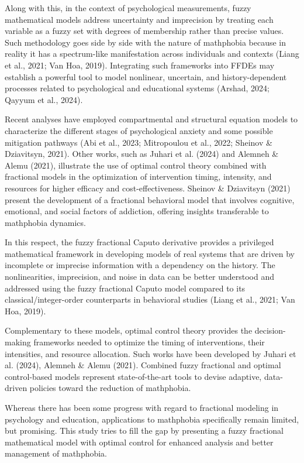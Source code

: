 \documentclass[10pt]{NSP1}
\begin{document}
Along with this, in the context of psychological measurements, fuzzy mathematical models address uncertainty and imprecision by treating each variable as a fuzzy set with degrees of membership rather than precise values. Such methodology goes side by side with the nature of mathphobia because in reality it has a spectrum-like manifestation across individuals and contexts (Liang et al., 2021; Van Hoa, 2019). Integrating such frameworks into FFDEs may establish a powerful tool to model nonlinear, uncertain, and history-dependent processes related to psychological and educational systems (Arshad, 2024; Qayyum et al., 2024).

Recent analyses have employed compartmental and structural equation models to characterize the different stages of psychological anxiety and some possible mitigation pathways (Abi et al., 2023; Mitropoulou et al., 2022; Sheinov \& Dziavitsyn, 2021). Other works, such as Juhari et al. (2024) and Alemneh \& Alemu (2021), illustrate the use of optimal control theory combined with fractional models in the optimization of intervention timing, intensity, and resources for higher efficacy and cost-effectiveness. Sheinov \& Dziavitsyn (2021) present the development of a fractional behavioral model that involves cognitive, emotional, and social factors of addiction, offering insights transferable to mathphobia dynamics.

In this respect, the fuzzy fractional Caputo derivative provides a privileged mathematical framework in developing models of real systems that are driven by incomplete or imprecise information with a dependency on the history. The nonlinearities, imprecision, and noise in data can be better understood and addressed using the fuzzy fractional Caputo model compared to its classical/integer-order counterparts in behavioral studies (Liang et al., 2021; Van Hoa, 2019).

Complementary to these models, optimal control theory provides the decision-making frameworks needed to optimize the timing of interventions, their intensities, and resource allocation. Such works have been developed by Juhari et al. (2024), Alemneh \& Alemu (2021). Combined fuzzy fractional and optimal control-based models represent state-of-the-art tools to devise adaptive, data-driven policies toward the reduction of mathphobia.

Whereas there has been some progress with regard to fractional modeling in psychology and education, applications to mathphobia specifically remain limited, but promising. This study tries to fill the gap by presenting a fuzzy fractional mathematical model with optimal control for enhanced analysis and better management of mathphobia.
\end{document}
